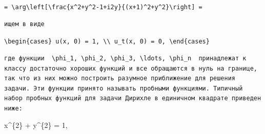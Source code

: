 \documentclass[
  ukrainian,
]{article}
\begin{document}
\texttt{=\ \textbackslash{}arg\textbackslash{}left{[}\textbackslash{}frac\{x\^{}2+y\^{}2-1+i2y\}\{(x+1)\^{}2+y\^{}2\}\textbackslash{}right{]}\ =}

\begin{verbatim}
ищем в виде
\end{verbatim}

\texttt{\textbackslash{}begin\{cases\}\ u(x,\ 0)\ =\ 1,\ \textbackslash{}\textbackslash{}\ u\_t(x,\ 0)\ =\ 0,\ \textbackslash{}end\{cases\}}

\begin{verbatim}
где функции  \phi_1, \phi_2, \phi_3, \ldots, \phi_n  принадлежат к классу достаточно хороших функций и все обращаются в нуль на границе, так что из них можно построить разумное приближение для решения задачи. Эти функции принято называть пробными функциями. Типичный набор пробных функций для задачи Дирихле в единичном квадрате приведен ниже:
\end{verbatim}

x\^{}\{2\} + y\^{}\{2\} = 1,
\end{document}
